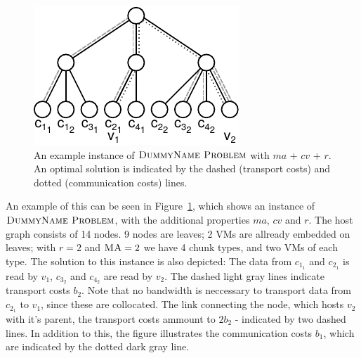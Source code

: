 \documentclass[9pt,twocolumn]{scrartcl}
\newcommand{\Chunk}{\ensuremath{c}}
\newcommand{\Problem}{\textsc{DummyName Problem}}
\newcommand{\MaFactor}{\ensuremath{\textsc{MA}}}
\newcommand{\RedundancyFactor}{\ensuremath{r}}
\newcommand{\VirtualNode}{\ensuremath{v}}
\newcommand{\CostCom}{\ensuremath{b_1}}
\newcommand{\CostTrans}{\ensuremath{b_2}}
\begin{document}
\begin{figure}[htbp]
\includegraphics[width =\columnwidth]{figs/model_ma_r_cv}
\caption{An example instance of $\Problem$ with $ma$ + $cv$ + $r$. An
optimal solution is indicated by the dashed (transport costs) and dotted
(communication costs) lines. }
\label{fig:model_combined}
\end{figure}

An example of this can be seen in Figure~\ref{fig:model_combined}, which shows
an instance of $\Problem$, with the additional properties $ma$, $cv$ and $r$.
The host graph consists of 14 nodes. 9 nodes are leaves; 2 VMs are allready
embedded on leaves; with $\RedundancyFactor = 2$ and $\MaFactor = 2$ we have 4
chunk types, and two VMs of each type. The solution to this instance is also
depicted: The data from $\Chunk_{1_1}$ and $\Chunk_{2_1}$ is read by
$\VirtualNode_1$, $\Chunk_{3_2}$ and $\Chunk_{4_2}$ are read by
$\VirtualNode_2$. The dashed light gray lines indicate transport
costs $\CostTrans$. Note that no bandwidth is neccessary to transport data from
$\Chunk_{2_1}$ to $\VirtualNode_1$, since these are collocated. The link
connecting the node, which hosts $\VirtualNode_2$ with it's parent, the
transport costs ammount to $2 \CostTrans$ - indicated by two dashed lines. In
addition to this, the figure illustrates the communication costs $\CostCom$,
which are indicated by the dotted dark gray line.

\end{document}
